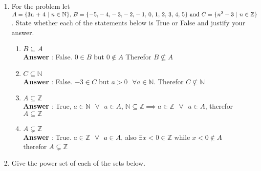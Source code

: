 \documentclass[a4paper,11pt]{article}
\begin{document}
\begin{enumerate}
\begin{enumerate}
  \end{enumerate}
  \newpage

\item For the problem let \( 
A = \lbrace $3n + 4$ \text{ }\vert\text{ }  n \in \mathbb{N} \rbrace \text{, } 
B =  \lbrace -5 \text{,} -4 \text{,} -3 \text{,} -2 \text{,} -1 \text{, } 0 \text{, } 1 \text{, } 2 \text{, } 3 \text{, } 4 \text{, } 5  \rbrace \text{ and } 
C = \lbrace n^2 - 3 \text{ }\vert \text{ }  n \in \mathbb{Z} \rbrace\). State whether each of the statements below is True or False and justify your answer.
  
  \begin{enumerate}
  \item $B \subseteq A$ \\
  \textbf{Answer} : False. $0 \in B$ but $0 \not\in A$ Therefor $B \not\subseteq A$

  \item $C \subseteq \mathbb{N}$ \\
  \textbf{Answer} : False. $ -3  \in C$ but  $a > 0\text{ } \forall a \in \mathbb{N}$. Therefor $C \not\subseteq \mathbb{N}$

  \item $A \subseteq \mathbb{Z}$ \\
  \textbf{Answer} : True, $a \in \mathbb{N} \text{ } \forall \text{ } a \in A \text{, } \mathbb{N} \subseteq \mathbb{Z} \implies a \in \mathbb{Z} \text{ } \forall \text{ } a \in A$, therefor $A \subseteq \mathbb{Z}$

  \item $A \subsetneq \mathbb{Z}$ \\
  \textbf{Answer} : True. 
   $a \in \mathbb{Z} \text{ } \forall \text{ } a \in A$,  also $\exists x < 0 \in \mathbb{Z}$ while $x < 0 \not\in A$  therefor $A \subsetneq \mathbb{Z}$

  \end{enumerate}

\item Give the power set of each of the sets below.


\end{enumerate}
\end{document}
